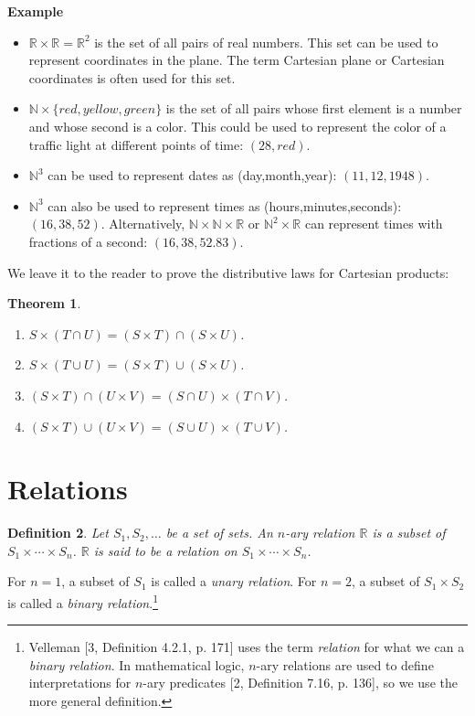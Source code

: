 \documentclass[12pt,a4paper]{article}
\newtheorem{theorem}{Theorem}
\newtheorem{definition}[theorem]{Definition}
\newenvironment{example}{\textbf{Example}}{}
\begin{document}
\begin{example}\mbox{}
\begin{itemize}
\item $\mathbb{R} \times \mathbb{R} = \mathbb{R}^{2}$ is the set of
all pairs of real numbers. This set can be used to represent coordinates in the plane. The term Cartesian plane or Cartesian coordinates is often used for this set.
\item $\mathbb{N} \times \{\mathit{red}, \mathit{yellow},
\mathit{green}\}$ is the set of all pairs whose first element is a
number and whose second is a color. This could be used to represent the
color of a traffic light at different points of time: $(28,\mathit{red})$.
\item $\mathbb{N}^3$ can be used to represent dates as (day,month,year): $(11,12,1948)$.
\item $\mathbb{N}^3$ can also be used to represent times as (hours,minutes,seconds): $(16,38,52)$. Alternatively, $\mathbb{N}\times \mathbb{N} \times \mathbb{R}$ or $\mathbb{N}^2 \times \mathbb{R}$ can represent times with fractions of a second: $(16,38,52.83)$.
\end{itemize}
\end{example}

We leave it to the reader to prove the distributive laws for Cartesian products:
\begin{theorem}\mbox{}
\begin{enumerate}
\item $S\times (T \cap U) = (S \times T) \cap (S\times U)$.
\item $S\times (T \cup U) = (S \times T) \cup (S\times U)$.
\item $(S \times T) \cap (U\times V) = (S \cap U) \times (T\cap V)$.
\item $(S \times T) \cup (U\times V) = (S \cup U) \times (T\cup V)$.
\end{enumerate}
\end{theorem}


\section{Relations}\label{s.relation}

\begin{definition}
Let $S_1, S_2, \ldots$ be a set of sets. An \emph{$n$-ary relation} $\mathbb{R}$ is a subset of $S_{1}\times \cdots \times S_{n}$. $\mathbb{R}$ is said to be a relation \emph{on} $S_{1}\times \cdots \times S_{n}$. 
\end{definition}
\vspace{-2ex}
For $n=1$, a subset of $S_1$ is called a \emph{unary relation}. For $n=2$, a subset of $S_1\times S_2$ is called a \emph{binary relation}.\footnote{Velleman [3, Definition 4.2.1, p. 171] uses the term \emph{relation} for what we can a \emph{binary relation}. In mathematical logic, $n$-ary relations are used to define interpretations for $n$-ary predicates [2, Definition 7.16, p. 136], so we use the more general definition.}
\end{document}
